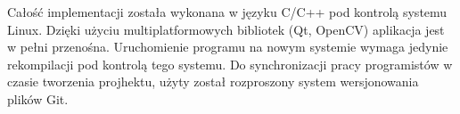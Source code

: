 \documentclass[a4paper,12pt]{article}
\begin{document}
Całość implementacji została wykonana w języku C/C++ pod kontrolą systemu Linux. Dzięki użyciu multiplatformowych bibliotek (Qt, OpenCV) aplikacja jest w pełni przenośna. Uruchomienie programu na nowym systemie wymaga jedynie rekompilacji pod kontrolą tego systemu. Do synchronizacji pracy programistów w czasie tworzenia projhektu, użyty został rozproszony system wersjonowania plików Git. 
%


{}
\end{document}
